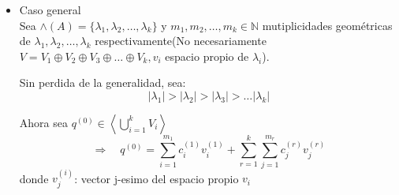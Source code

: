 \documentclass[10pt,a4paper]{article}
\begin{document}
\begin{itemize}
	\item Caso general\\
	
	Sea $\wedge (A) = \{\lambda_{1},\lambda_{2},\ldots ,\lambda_{k}\}$ y $m_{1},m_{2}, \ldots , m_{k}\in\mathbb{N}$ mutiplicidades geométricas de $\lambda_{1},\lambda_{2},\ldots ,\lambda_{k}$ respectivamente(No necesariamente $V = V_{1}\oplus V_{2}\oplus V_{3}\oplus\ldots\oplus V_{k}, v_{i}$ espacio propio de $\lambda_{i}$).
	
	Sin perdida de la generalidad, sea:
	$$\vert\lambda_{1}\vert > \vert\lambda_{2}\vert > \vert\lambda_{3}\vert > \ldots\vert\lambda_{k}\vert$$
	
	Ahora sea $q^{(0)}\in\left<\bigcup_{i=1}^{k}V_{i}\right>$
	$$\Rightarrow\quad q^{(0)} = \sum_{i=1}^{m_{1}}c_{i}^{(1)}v_{i}^{(1)} + \sum_{r=1}^{k}\sum_{j=1}^{m_{r}}c_{j}^{(r)}v_{j}^{(r)}$$
	donde $v_{j}^{(i)}$: vector j-esimo del espacio propio $v_{i}$


\end{itemize}
\end{document}

